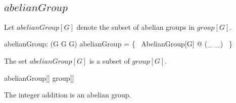 \documentclass[11pt, oneside]{article}
\begin{document}
\subsection{$abelianGroup$}

Let $abelianGroup[G]$ denote the subset of abelian groups in $group[G]$.

\begin{gendef}[G]
	abelianGroup: \power(G \cross G \fun G)
\where
	abelianGroup = \{~ AbelianGroup[G] @ (\_ \gadd \_) ~\}
\end{gendef}

\begin{remark}
The set $abelianGroup[G]$ is a subset of $group[G]$.

\begin{zed}
	abelianGroup[\setX] \subseteq group[\setX]
\end{zed}

\end{remark}

\begin{example}
The integer addition is an abelian group.


\end{example}

\printbibliography
\end{document}
